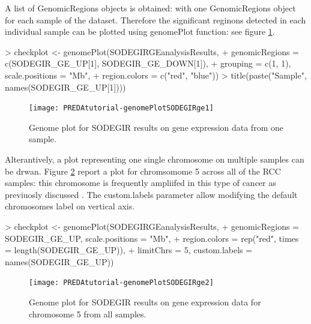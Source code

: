 \documentclass[a4paper,10pt]{article}
\begin{document}
A list of GenomicRegions objects is obtained: with one GenomicRegions object for each sample of the dataset.
Therefore the significant reginons detected in each individual sample can be plotted using genomePlot function: see figure \ref{fig:genomePlotSODEGIRgeOnesample}.


\begin{Schunk}
\begin{Sinput}
> checkplot <- genomePlot(SODEGIRGEanalysisResults, 
+     genomicRegions = c(SODEGIR_GE_UP[1], SODEGIR_GE_DOWN[1]), 
+     grouping = c(1, 1), scale.positions = "Mb", 
+     region.colors = c("red", "blue"))
> title(paste("Sample", names(SODEGIR_GE_UP[1])))
\end{Sinput}
\end{Schunk}

\begin{figure}[htbp]
 \centering
\texttt{[image: PREDAtutorial-genomePlotSODEGIRge1]}
 \caption{Genome plot for SODEGIR results on gene expression data from one sample.}
 \label{fig:genomePlotSODEGIRgeOnesample}
\end{figure}


Alterantively, a plot representing one single chromosome on multiple samples can be drwan. Figure \ref{fig:genomePlotSODEGIRgeOnechromosome} report a plot for chromsomome 5 across all of the RCC samples: this chromosome is frequently ampliifed in this type of cancer as previuosly discussed \cite{PubMed_19542187}. The custom.labels parameter allow modifying the default chromosomes label on vertical axis.


\begin{Schunk}
\begin{Sinput}
> checkplot <- genomePlot(SODEGIRGEanalysisResults, 
+     genomicRegions = SODEGIR_GE_UP, scale.positions = "Mb", 
+     region.colors = rep("red", times = length(SODEGIR_GE_UP)), 
+     limitChrs = 5, custom.labels = names(SODEGIR_GE_UP))
\end{Sinput}
\end{Schunk}

\begin{figure}[htbp]
 \centering
\texttt{[image: PREDAtutorial-genomePlotSODEGIRge2]}
 \caption{Genome plot for SODEGIR results on gene expression data for chromosome 5 from all samples.}
 \label{fig:genomePlotSODEGIRgeOnechromosome}
\end{figure}
\end{document}
